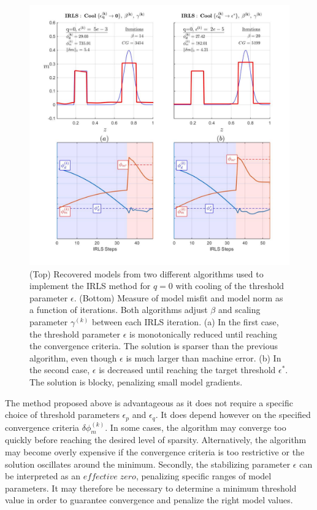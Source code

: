 \begin{figure}[p]
\includegraphics[scale=0.57]{1D_IRLS_algo3}
\caption{(Top) Recovered models from two different algorithms used to implement the IRLS method for $q=0$ with cooling of the threshold parameter $\epsilon$. (Bottom) Measure of model misfit and model norm as a function of iterations. Both algorithms adjust $\beta$ and scaling parameter $\gamma^{(k)}$ between each IRLS iteration. (a) In the first case, the threshold parameter $\epsilon$ is monotonically reduced until reaching the convergence criteria. The solution is sparser than the previous algorithm, even though $\epsilon$ is much larger than machine error.
(b) In the second case, $\epsilon$ is decreased until reaching the target threshold $\epsilon^*$. The solution is blocky, penalizing small model gradients.}
\label{fig:1D_IRLS_algo3}
\end{figure}

The method proposed above is advantageous as it does not require a specific choice of threshold parameters $\epsilon_p$ and $\epsilon_q$.
It does depend however on the specified convergence criteria $\delta \phi_m^{(k)}$.
In some cases, the algorithm may converge too quickly before reaching the desired level of sparsity. 
Alternatively, the algorithm may become overly expensive if the convergence criteria is too restrictive or the solution oscillates around the minimum. 
Secondly, the stabilizing parameter $\epsilon$ can be interpreted as an $effective\;zero$, penalizing specific ranges of model parameters.
It may therefore be necessary to determine a minimum threshold value in order to guarantee convergence and penalize the right model values.

